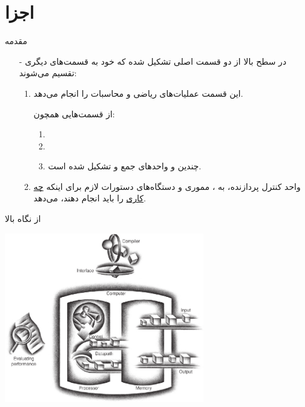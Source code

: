 \section{اجزا}
\begin{frame}{مقدمه}
\begin{itemize}\itemr
\item[-]
در سطح بالا 
از دو قسمت اصلی تشکیل شده که خود به قسمت‌های دیگری تقسیم می‌شوند:
\begin{enumerate}\itemr
\item {}

این قسمت عملیات‌های ریاضی و محاسبات را انجام می‌دهد. 

از قسمت‌هایی همچون:
\begin{enumerate}\itemr
\item {}
\item {}
\item 
چندین
و واحد‌های جمع و 
 تشکیل شده است.
\end{enumerate} 
\item {}

واحد کنترل پردازنده، به ، مموری و دستگاه‌های 
دستورات لازم برای اینکه \underline{چه کاری} را باید انجام دهند، می‌دهد.
\end{enumerate}
\end{itemize}
\end{frame}

\begin{frame}{ از نگاه بالا}
\begin{center}
\includegraphics[width=0.65\textwidth, height=0.9\textheight]{docs/images/cpu-high-level}
\end{center}
\end{frame}

